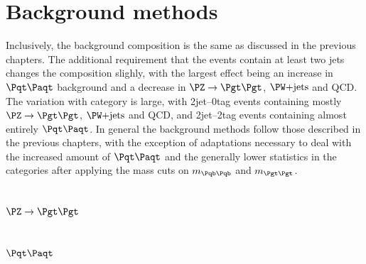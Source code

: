 \section{Background methods}
\label{sec:Hhhbackgrounds}

Inclusively, the background composition is the same as discussed in the previous
chapters. The additional requirement that the events contain at least two jets
changes the composition slighly, with the largest effect being an increase in
$\ttbar$ background and a decrease in $\ZToTauTau$, $\WJets$ and QCD. The
variation with category is large, with 2jet--0tag events containing mostly
$\ZToTauTau$, $\WJets$ and QCD, and 2jet--2tag events containing almost entirely
$\ttbar$. In general the background methods follow those described in the
previous chapters, with the exception of adaptations necessary to deal with the
increased amount of $\ttbar$ and the generally lower statistics in the
categories after applying the mass cuts on $m_{\Pqb\Pqb}$ and $m_{\Pgt\Pgt}$.

\subsection{$\ZToTauTau$}

\subsection{$\ttbar$}

